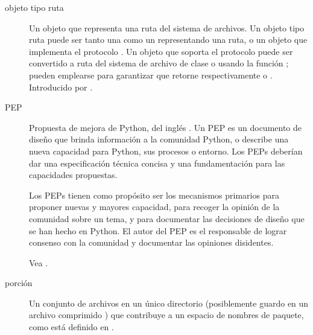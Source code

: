 \documentclass[a4,10pt,spanish]{sphinxmanual}
\begin{document}
\begin{description}
\item[{objeto tipo ruta\label{\detokenize{glossary:term-path-like-object}}}] \leavevmode
\sphinxAtStartPar
Un objeto que representa una ruta del sistema de archivos. Un objeto tipo ruta puede ser tanto una  como un  representando una ruta, o un objeto que implementa el protocolo . Un objeto que soporta el protocolo   puede ser convertido a ruta del sistema de archivo de clase  o  usando la función ;   pueden emplearse para garantizar que retorne respectivamente  o . Introducido por .

\item[{PEP\label{\detokenize{glossary:term-PEP}}}] \leavevmode
\sphinxAtStartPar
Propuesta de mejora de Python, del inglés . Un PEP es un documento de diseño que brinda información a la comunidad Python, o describe una nueva capacidad para Python, sus procesos o entorno. Los PEPs deberían dar una especificación técnica concisa y una fundamentación para las capacidades propuestas.

\sphinxAtStartPar
Los PEPs tienen como propósito ser los mecanismos primarios para proponer nuevas y mayores capacidad, para recoger la opinión de la comunidad sobre un tema, y para documentar las decisiones de diseño que se han hecho en Python. El autor del PEP es el responsable de lograr consenso con la comunidad y documentar las opiniones disidentes.

\sphinxAtStartPar
Vea .

\item[{porción\label{\detokenize{glossary:term-portion}}}] \leavevmode
\sphinxAtStartPar
Un conjunto de archivos en un único directorio (posiblemente guardo en un archivo comprimido ) que contribuye a un espacio de nombres de paquete, como está definido en .


\end{description}
\end{document}
